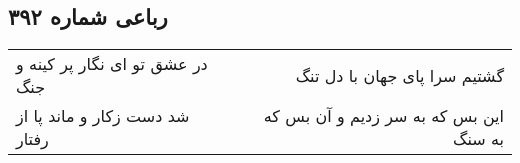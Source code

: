 \begin{center}
\section*{رباعی شماره ۳۹۲}
\label{sec:sh392}
\begin{longtable}{l p{0.5cm} r}
در عشق تو ای نگار پر کینه و جنگ
&&
گشتیم سرا پای جهان با دل تنگ
\\
شد دست زکار و ماند پا از رفتار
&&
این بس که به سر زدیم و آن بس که به سنگ
\\
\end{longtable}
\end{center}
